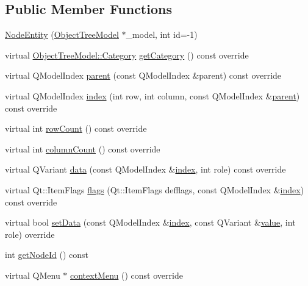 \subsection*{Public Member Functions}
\begin{DoxyCompactItemize}
\item 
\mbox{\hyperlink{classobjecttree_1_1_node_entity_ad70df4ceddd7e79f626f62c37e12fca3}{Node\+Entity}} (\mbox{\hyperlink{class_object_tree_model}{Object\+Tree\+Model}} $\ast$\+\_\+model, int id=-\/1)
\item 
virtual \mbox{\hyperlink{class_object_tree_model_a379e9d6b0d381853785adf62095ba4e3}{Object\+Tree\+Model\+::\+Category}} \mbox{\hyperlink{classobjecttree_1_1_node_entity_abb9330a2e5bc9a6afc6b035d07a3b149}{get\+Category}} () const override
\item 
virtual Q\+Model\+Index \mbox{\hyperlink{classobjecttree_1_1_node_entity_aa55851c6cec05dad2f9e4b0705eafa68}{parent}} (const Q\+Model\+Index \&parent) const override
\item 
virtual Q\+Model\+Index \mbox{\hyperlink{classobjecttree_1_1_node_entity_a2ad069b13c5ce29c4239acd2c4eeda24}{index}} (int row, int column, const Q\+Model\+Index \&\mbox{\hyperlink{classobjecttree_1_1_node_entity_aa55851c6cec05dad2f9e4b0705eafa68}{parent}}) const override
\item 
virtual int \mbox{\hyperlink{classobjecttree_1_1_node_entity_a0cb1dcb7837edb77b42fb2d758d5c286}{row\+Count}} () const override
\item 
virtual int \mbox{\hyperlink{classobjecttree_1_1_node_entity_a9429614bf6e56a4a1bcc67403f7733b0}{column\+Count}} () const override
\item 
virtual Q\+Variant \mbox{\hyperlink{classobjecttree_1_1_node_entity_af154f5a4972a033ac7303225aeae81cc}{data}} (const Q\+Model\+Index \&\mbox{\hyperlink{classobjecttree_1_1_node_entity_a2ad069b13c5ce29c4239acd2c4eeda24}{index}}, int role) const override
\item 
virtual Qt\+::\+Item\+Flags \mbox{\hyperlink{classobjecttree_1_1_node_entity_ac710602e9c61c23ebf718c815044eff7}{flags}} (Qt\+::\+Item\+Flags defflags, const Q\+Model\+Index \&\mbox{\hyperlink{classobjecttree_1_1_node_entity_a2ad069b13c5ce29c4239acd2c4eeda24}{index}}) const override
\item 
virtual bool \mbox{\hyperlink{classobjecttree_1_1_node_entity_a0ea396d5931c5e5984a1d4c8188163ea}{set\+Data}} (const Q\+Model\+Index \&\mbox{\hyperlink{classobjecttree_1_1_node_entity_a2ad069b13c5ce29c4239acd2c4eeda24}{index}}, const Q\+Variant \&\mbox{\hyperlink{diffusion_8cpp_a4b41795815d9f3d03abfc739e666d5da}{value}}, int role) override
\item 
int \mbox{\hyperlink{classobjecttree_1_1_node_entity_a9466fa14a33aee9c2953fb57313b0735}{get\+Node\+Id}} () const
\item 
virtual Q\+Menu $\ast$ \mbox{\hyperlink{classobjecttree_1_1_node_entity_a03445bba05e894cefaa96aeb49abeacc}{context\+Menu}} () const override
\end{DoxyCompactItemize}
